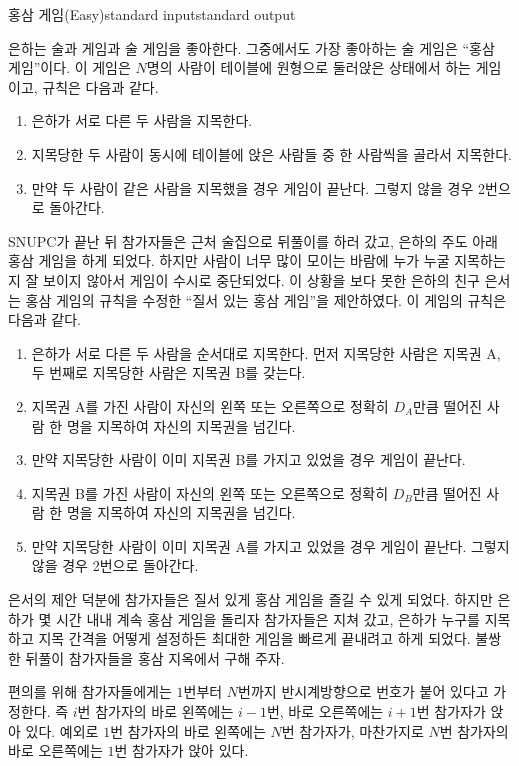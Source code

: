 \begin{problem}{홍삼 게임(Easy)}{standard input}{standard output}

은하는 술과 게임과 술 게임을 좋아한다. 그중에서도 가장 좋아하는 술 게임은 ``홍삼 게임''이다. 이 게임은 $N$명의 사람이 테이블에 원형으로 둘러앉은 상태에서 하는 게임이고, 규칙은 다음과 같다.

\begin{enumerate}
\item{은하가 서로 다른 두 사람을 지목한다.}
\item{지목당한 두 사람이 동시에 테이블에 앉은 사람들 중 한 사람씩을 골라서 지목한다.}
\item{만약 두 사람이 같은 사람을 지목했을 경우 게임이 끝난다. 그렇지 않을 경우 2번으로 돌아간다.}
\end{enumerate}

SNUPC가 끝난 뒤 참가자들은 근처 술집으로 뒤풀이를 하러 갔고, 은하의 주도 아래 홍삼 게임을 하게 되었다. 하지만 사람이 너무 많이 모이는 바람에 누가 누굴 지목하는지 잘 보이지 않아서 게임이 수시로 중단되었다. 이 상황을 보다 못한 은하의 친구 은서는 홍삼 게임의 규칙을 수정한 ``질서 있는 홍삼 게임''을 제안하였다. 이 게임의 규칙은 다음과 같다.

\begin{enumerate}
\item{은하가 서로 다른 두 사람을 순서대로 지목한다. 먼저 지목당한 사람은 지목권 A, 두 번째로 지목당한 사람은 지목권 B를 갖는다.}
\item{지목권 A를 가진 사람이 자신의 왼쪽 또는 오른쪽으로 정확히 $D_{A}$만큼 떨어진 사람 한 명을 지목하여 자신의 지목권을 넘긴다.}
\item{만약 지목당한 사람이 이미 지목권 B를 가지고 있었을 경우 게임이 끝난다.}
\item{지목권 B를 가진 사람이 자신의 왼쪽 또는 오른쪽으로 정확히 $D_{B}$만큼 떨어진 사람 한 명을 지목하여 자신의 지목권을 넘긴다.}
\item{만약 지목당한 사람이 이미 지목권 A를 가지고 있었을 경우 게임이 끝난다. 그렇지 않을 경우 2번으로 돌아간다.}
\end{enumerate}

은서의 제안 덕분에 참가자들은 질서 있게 홍삼 게임을 즐길 수 있게 되었다. 하지만 은하가 몇 시간 내내 계속 홍삼 게임을 돌리자 참가자들은 지쳐 갔고, 은하가 누구를 지목하고 지목 간격을 어떻게 설정하든 최대한 게임을 빠르게 끝내려고 하게 되었다. 불쌍한 뒤풀이 참가자들을 홍삼 지옥에서 구해 주자.

편의를 위해 참가자들에게는 $1$번부터 $N$번까지 반시계방향으로 번호가 붙어 있다고 가정한다. 즉 $i$번 참가자의 바로 왼쪽에는 $i-1$번, 바로 오른쪽에는 $i+1$번 참가자가 앉아 있다. 예외로 $1$번 참가자의 바로 왼쪽에는 $N$번 참가자가, 마찬가지로 $N$번 참가자의 바로 오른쪽에는 $1$번 참가자가 앉아 있다.


\end{problem}
